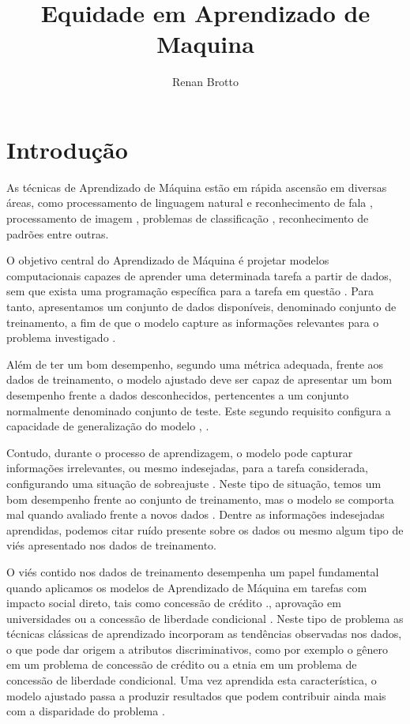 \documentclass[11pt]{article}
\title{Equidade em Aprendizado de Maquina}
\author{Renan Brotto}
\begin{document}
    
    
    \maketitle
    
    

   
\hypertarget{introduuxe7uxe3o}{%
\section{Introdução}\label{introduuxe7uxe3o}}

As técnicas de Aprendizado de Máquina estão em rápida ascensão em
diversas áreas, como processamento de linguagem natural e reconhecimento
de fala \cite{Kamath2019}, processamento de imagem \cite{Cipolla2013},
problemas de classificação \cite{Duda2000}, reconhecimento de padrões
\cite{Bishop2006} entre outras.

O objetivo central do Aprendizado de Máquina é projetar modelos
computacionais capazes de aprender uma determinada tarefa a partir de
dados, sem que exista uma programação específica para a tarefa em
questão \cite{Samuel1959}. Para tanto, apresentamos um conjunto de dados
disponíveis, denominado conjunto de treinamento, a fim de que o modelo
capture as informações relevantes para o problema investigado
\cite{Hastie2009}.

Além de ter um bom desempenho, segundo uma métrica adequada, frente aos
dados de treinamento, o modelo ajustado deve ser capaz de apresentar um
bom desempenho frente a dados desconhecidos, pertencentes a um conjunto
normalmente denominado conjunto de teste. Este segundo requisito
configura a capacidade de generalização do modelo \cite{Bishop2006},
\cite{haykin-rn}.

Contudo, durante o processo de aprendizagem, o modelo pode capturar
informações irrelevantes, ou mesmo indesejadas, para a tarefa
considerada, configurando uma situação de sobreajuste \cite{haykin-rn}.
Neste tipo de situação, temos um bom desempenho frente ao conjunto de
treinamento, mas o modelo se comporta mal quando avaliado frente a novos
dados \cite{Bishop2006}. Dentre as informações indesejadas aprendidas,
podemos citar ruído presente sobre os dados \cite{Bishop2006} ou mesmo
algum tipo de viés apresentado nos dados de treinamento.

O viés contido nos dados de treinamento desempenha um papel fundamental
quando aplicamos os modelos de Aprendizado de Máquina em tarefas com
impacto social direto, tais como concessão de crédito \cite{ONeil2016}.,
aprovação em universidades \cite{ONeil2016} ou a concessão de liberdade
condicional \cite{Chouldechova2017}. Neste tipo de problema as técnicas
clássicas de aprendizado incorporam as tendências observadas nos dados,
o que pode dar origem a atributos discriminativos, como por exemplo o
gênero em um problema de concessão de crédito ou a etnia em um problema
de concessão de liberdade condicional. Uma vez aprendida esta
característica, o modelo ajustado passa a produzir resultados que podem
contribuir ainda mais com a disparidade do problema \cite{ONeil2016}.
\end{document}
